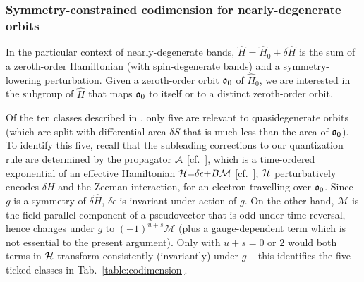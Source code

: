 \documentclass[aps, prb, showpacs, twocolumn, notitlepage, superscriptaddress]{revtex4-1}
\begin{document}


 

\subsubsection{Symmetry-constrained codimension for nearly-degenerate orbits}\label{sec:codimquasideg}


In the particular context of nearly-degenerate bands, $\hat{H}{=}\hat{H}_0{+}\delta \hat{H}$ is the sum of a zeroth-order Hamiltonian (with spin-degenerate bands) and a symmetry-lowering perturbation.  Given a zeroth-order orbit $\mathfrak{o}_0$ of $\hat{H}_0$, we  are interested in the subgroup of $\hat{H}$ that  maps $\mathfrak{o}_0$ to itself or to a distinct zeroth-order orbit. 

Of the ten classes described in , only five   are relevant to quasidegenerate orbits (which are split with differential area  $\delta S$ that is much less than the area of $\mathfrak{o}_0$).
To identify this five, recall that the subleading corrections to our quantization rule are determined by the propagator ${\cal A}$ [cf.\ ], which is a time-ordered exponential of an effective Hamiltonian $\mathcal{H}{=}\delta\epsilon{+}B \mathcal{M}$ [cf.\ ]; $\mathcal{H}$ perturbatively encodes $\delta H$ and the Zeeman interaction, for an electron travelling over  $\mathfrak{o}_0$. Since $g$ is  a symmetry of  $\delta \hat{H}$, $\delta\epsilon$ is invariant under action of $g$. On the other hand, $\mathcal{M}$ is the field-parallel component of a pseudovector that is odd under time reversal\cite{sakurai1995modern}, hence changes under $g$ to  $(-1)^{u+s}\mathcal{M}$ (plus a gauge-dependent term\cite{100p} which is not essential to the present argument). Only with $u{+}s{=}0$ or $2$ would both terms in $\mathcal{H}$ transform consistently (invariantly) under $g$ -- this identifies the five ticked classes in Tab.\ \ref{table:codimension}.


\end{document}
